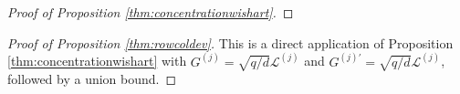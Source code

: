 \documentclass[11pt,letterpaper]{article}
\newcommand{\be}{\mathbf{e}}
\begin{document}
\begin{proof}[Proof of Proposition \ref{thm:concentrationwishart}]
\end{proof}

\begin{proof}[Proof of Proposition \ref{thm:rowcoldev}]
	This is a direct application of Proposition \ref{thm:concentrationwishart} with $G^{(j)} =\sqrt{q/d} \mathcal{L}^{(j)}$ and $G^{(j)\prime} =\sqrt{q/d} \mathcal{L}^{(j)}$, followed by a union bound.
\end{proof}
\end{document}
